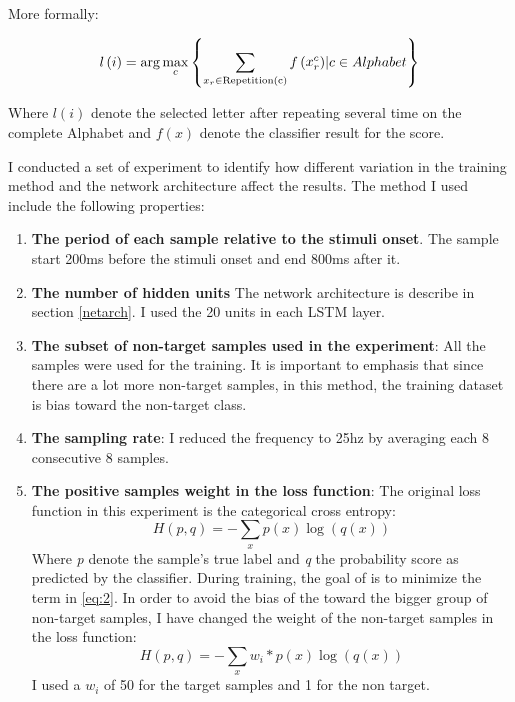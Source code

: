 \documentclass[]{report}
\begin{document}
More formally:

\newcommand{\argmin}{\operatornamewithlimits{argmin}}
\[l\left( i \right) = \arg {\max _c}\left\{ {\sum\limits_{{x_r} \in {\rm{Repetition(c)}}}^{} {f\left( {\mathop x\nolimits_r^c } \right)} |c \in Alphabet} \right\}\]



Where $l(i)$ denote the selected letter after repeating several time on the complete Alphabet and $f(x)$ denote the classifier result for the score.



I conducted a set of experiment to identify how different variation in the training method and the network architecture affect the results. The method I used include the following properties:

\begin{enumerate}
	\item \textbf{The period of each sample relative to the stimuli onset}. The sample start 200ms before the stimuli onset and end 800ms after it. %
	
	\item \textbf{The number of hidden units} The network architecture is describe in section \ref{netarch}. I used the 20 units in each LSTM layer. %
	

	
	\item \textbf{The subset of non-target samples used in the experiment}:	All the samples were used for the training. It is important to emphasis that since there are a lot more non-target samples, in this method, the training dataset is bias toward the non-target class. 
	\item \textbf{The sampling rate}: I reduced the frequency to 25hz by averaging each 8 consecutive 8 samples.
	\item \textbf{The positive samples weight in the loss function}: 
	The original loss function in this experiment is the categorical cross entropy:
	\begin{equation}\label{eq:2}
	H(p,q) = - \sum_x p(x) \log(q(x))
	\end{equation}
	Where \textit{p} denote the sample's true label and \textit{q} the probability score as predicted by the classifier. During training, the goal of is to minimize the term in \eqref{eq:2}. In order to avoid the bias of the toward the bigger group of non-target samples, I have changed the weight of the non-target samples in the loss function:
	\begin{equation}\label{eq:3}
	H(p,q) = - \sum_x w_i*p(x) \log(q(x)) 
	\end{equation}
	I used a $w_i$ of 50 for the target samples and 1 for the non target.
	
	
\end{enumerate}
\end{document}

